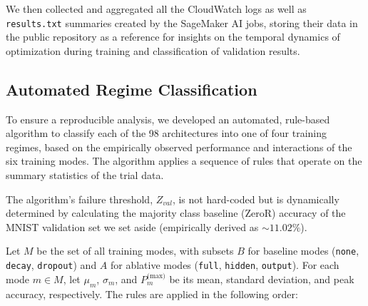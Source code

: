 \documentclass[conference]{IEEEtran}
\begin{document}
We then collected and aggregated all the CloudWatch logs as well as \verb|results.txt| summaries created by the SageMaker AI jobs, storing their data in the public repository as a reference for insights on the temporal dynamics of optimization during training and classification of validation results.

\subsection{Automated Regime Classification}

To ensure a reproducible analysis, we developed an automated, rule-based algorithm to classify each of the 98 architectures into one of four training regimes, based on the empirically observed performance and interactions of the six training modes. The algorithm applies a sequence of rules that operate on the summary statistics of the trial data.

The algorithm's failure threshold, $Z_{val}$, is not hard-coded but is dynamically determined by calculating the majority class baseline (ZeroR) accuracy of the MNIST validation set we set aside (empirically derived as $\sim11.02\%$).

Let $M$ be the set of all training modes, with subsets $B$ for baseline modes (\texttt{none}, \texttt{decay}, \texttt{dropout}) and $A$ for ablative modes (\texttt{full}, \texttt{hidden}, \texttt{output}). For each mode $m \in M$, let $\mu_m$, $\sigma_m$, and $P_m^{\text{(max)}}$ be its mean, standard deviation, and peak accuracy, respectively. The rules are applied in the following order:
\end{document}
